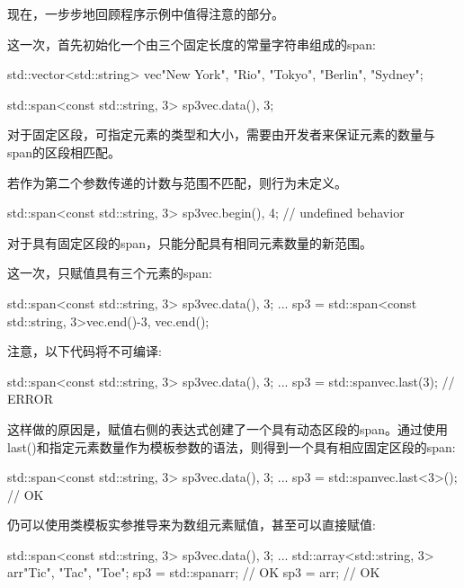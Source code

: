 现在，一步步地回顾程序示例中值得注意的部分。


这一次，首先初始化一个由三个固定长度的常量字符串组成的span:

\begin{cpp}
std::vector<std::string> vec{"New York", "Rio", "Tokyo", "Berlin", "Sydney"};

std::span<const std::string, 3> sp3{vec.data(), 3};
\end{cpp}

对于固定区段，可指定元素的类型和大小，需要由开发者来保证元素的数量与span的区段相匹配。

若作为第二个参数传递的计数与范围不匹配，则行为未定义。

\begin{cpp}
std::span<const std::string, 3> sp3{vec.begin(), 4}; // undefined behavior
\end{cpp}


对于具有固定区段的span，只能分配具有相同元素数量的新范围。

这一次，只赋值具有三个元素的span:

\begin{cpp}
std::span<const std::string, 3> sp3{vec.data(), 3};
...
sp3 = std::span<const std::string, 3>{vec.end()-3, vec.end()};
\end{cpp}

注意，以下代码将不可编译:

\begin{cpp}
std::span<const std::string, 3> sp3{vec.data(), 3};
...
sp3 = std::span{vec}.last(3); // ERROR
\end{cpp}

这样做的原因是，赋值右侧的表达式创建了一个具有动态区段的span。通过使用last()和指定元素数量作为模板参数的语法，则得到一个具有相应固定区段的span:

\begin{cpp}
std::span<const std::string, 3> sp3{vec.data(), 3};
...
sp3 = std::span{vec}.last<3>(); // OK
\end{cpp}

仍可以使用类模板实参推导来为数组元素赋值，甚至可以直接赋值:

\begin{cpp}
std::span<const std::string, 3> sp3{vec.data(), 3};
...
std::array<std::string, 3> arr{"Tic", "Tac", "Toe"};
sp3 = std::span{arr}; // OK
sp3 = arr; // OK
\end{cpp}

